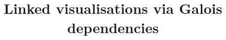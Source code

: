 \documentclass[preprint,acmsmall,screen]{acmart}
\begin{document}
\title{Linked visualisations via Galois dependencies}


\maketitle



\clearpage
\pagebreak

\end{document}
